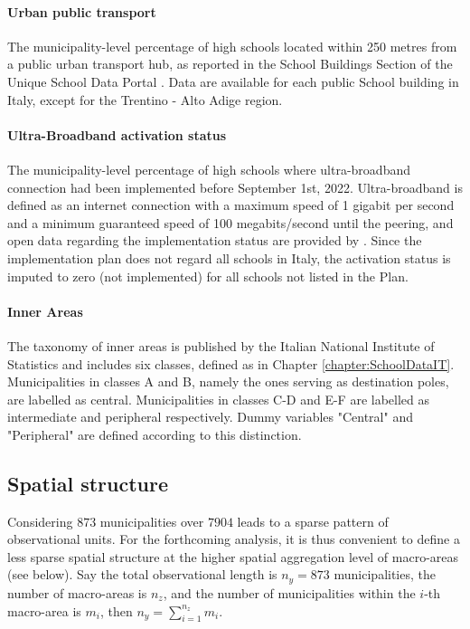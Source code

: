 \documentclass[openany, 11pt, oneside]{book}
\begin{document}
\paragraph{Urban public transport} The municipality-level percentage of high schools located within 250 metres from a public urban transport hub, as reported in the School Buildings Section of the Unique School Data Portal \parencite{MIUR}. Data are available for each public School building in Italy, except for the Trentino - Alto Adige region.  
 
\paragraph{Ultra-Broadband activation status} The municipality-level percentage of high schools where ultra-broadband connection had been implemented before September 1st, 2022. Ultra-broadband is defined as an internet connection with a maximum speed of 1 gigabit per second and a minimum guaranteed speed of 100 megabits/second until the peering, and open data regarding the implementation status are provided by \cite{BB}. Since the implementation plan does not regard all schools in Italy, the activation status is imputed to zero (not implemented) for all schools not listed in the Plan.

\paragraph{Inner Areas}\label{par:inner} The taxonomy of inner areas is published by the Italian National Institute of Statistics \parencite{InnerAreas} and includes six classes, defined as in Chapter \ref{chapter:SchoolDataIT}. Municipalities in classes A and B, namely the ones serving as destination poles, are labelled as central. Municipalities in classes C-D and E-F are labelled as intermediate and peripheral respectively. Dummy variables "Central" and "Peripheral" are defined according to this distinction.

\subsection{Spatial structure} \label{par:graph}

Considering $873$ municipalities over $7904$ leads to a sparse pattern of observational units. For the forthcoming analysis, it is thus convenient to define a less sparse spatial structure at the higher spatial aggregation level of macro-areas (see below). Say the total observational length is $n_y = 873$ municipalities, the number of macro-areas is $n_z$, and the number of municipalities within the $i$-th macro-area is $m_i$, then $n_y = \sum_{i=1}^{n_z} m_i$.
\end{document}
